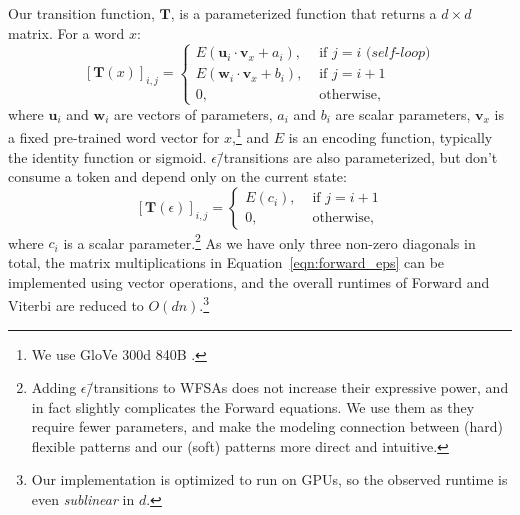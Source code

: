 \documentclass[11pt,a4paper]{article}
\renewcommand{\cite}[1]{\citep{#1}}
\newcommand{\softps}{patterns\xspace}
\newcommand{\epstrans}{$\epsilon$\=/transition} %
\newcommand{\tensor}[1]{\mathbf{#1}}
\begin{document}
Our transition function, $\tensor{T}$, is a parameterized function that returns a $d \times d$ matrix.
For a word $x$:\begin{equation}
\label{eqn:main-self-transitions}
\left[\tensor{T}(x)\right]_{i,j} =
  \begin{cases}
    E(\tensor{u}_{i} \cdot \tensor{v}_x + a_{i}), & \text{ if } j = i \textit{ (self-loop)} \\
    E(\tensor{w}_{i} \cdot \tensor{v}_x + b_{i}), & \text{ if } j = i+1 \\ 
    0, & \text{ otherwise,}
  \end{cases}
\end{equation}
where $\tensor{u}_{i}$ and $\tensor{w}_{i}$ are vectors of parameters, $a_{i}$  and $b_i$ are scalar parameters, $\tensor{v}_x$ is a fixed pre-trained word vector for $x$,\footnote{We use GloVe 300d 840B \cite{Pennington:2014}.} and $E$ is an encoding function, typically the identity function or sigmoid.
\epstrans s are also parameterized, but don't consume a token and depend only on the current state:\begin{equation}
\label{eqn:eps_transitions}
\left[\tensor{T}(\epsilon)\right]_{i,j} =
  \begin{cases}
    E(c_{i}), & \text{ if } j = i+1 \\
    0, & \text{ otherwise,}
  \end{cases}
\end{equation}
where $c_i$ is a scalar parameter.\footnote{Adding \epstrans s to WFSAs does not increase their expressive power, and in fact slightly complicates the Forward equations.
We use them as they require fewer parameters, and make the modeling connection between (hard) flexible patterns and our (soft) \softps more direct and intuitive.
}
As we have only three non-zero diagonals in total, the matrix multiplications in Equation~\ref{eqn:forward_eps} can be implemented using vector operations, and the overall runtimes of Forward and Viterbi are reduced to $O(dn)$.\footnote{Our implementation is optimized to run on GPUs, so the observed runtime is even {\it sublinear} in $d$.}
\end{document}
